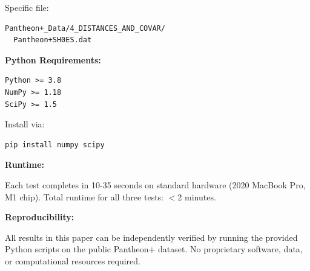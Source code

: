 \documentclass[twocolumn,superscriptaddress,prd,amsmath,amssymb]{revtex4-2}
\begin{document}
Specific file:
\begin{verbatim}
Pantheon+_Data/4_DISTANCES_AND_COVAR/
  Pantheon+SH0ES.dat
\end{verbatim}

\textbf{Python Requirements:}

\begin{verbatim}
Python >= 3.8
NumPy >= 1.18
SciPy >= 1.5
\end{verbatim}

Install via:
\begin{verbatim}
pip install numpy scipy
\end{verbatim}

\textbf{Runtime:}

Each test completes in 10-35 seconds on standard hardware (2020 MacBook Pro, M1 chip). Total runtime for all three tests: $<$2 minutes.

\textbf{Reproducibility:}

All results in this paper can be independently verified by running the provided Python scripts on the public Pantheon+ dataset. No proprietary software, data, or computational resources required.
\end{document}
